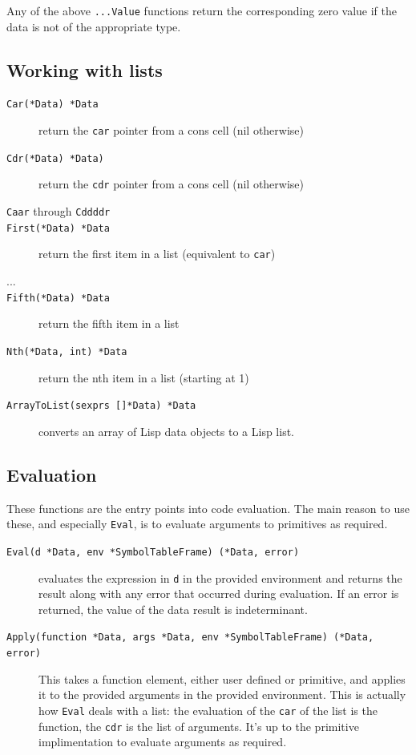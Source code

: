 \documentclass[12pt]{article}
\begin{document}
\noindent Any of the above \verb|...Value| functions return the
corresponding zero value if the data is 
not of the appropriate type.

\subsection{Working with lists}

\begin{description}
\item [{\tt Car(*Data) *Data}] return the \verb|car| pointer from a cons
  cell (nil otherwise)
\item [{\tt Cdr(*Data) *Data)}] return the \verb|cdr| pointer from a cons
  cell (nil otherwise)
\item [{\tt Caar} through {\tt Cddddr}]
\item [{\tt First(*Data) *Data}] return the first item in a list
  (equivalent to \verb|car|)
\item [...]
\item [{\tt Fifth(*Data) *Data}] return the fifth item in a list
\item [{\tt Nth(*Data, int) *Data}] return the nth item in a list
  (starting at 1)
\item [{\tt ArrayToList(sexprs []*Data) *Data}] converts an array of
  Lisp data objects to a Lisp list.
\end{description}

\subsection{Evaluation}

These functions are the entry points into code evaluation. The main
reason to use these, and especially \verb|Eval|, is to evaluate
arguments to primitives as required.

\begin{description}
\item [{\tt Eval(d *Data, env *SymbolTableFrame) (*Data, error)}] evaluates the expression in \verb|d| in the provided
  environment and returns the result along with any error that
  occurred during evaluation. If an error is returned, the value of
  the data result is indeterminant.
\item [{\tt Apply(function *Data, args *Data, env *SymbolTableFrame)
    (*Data, error)}] This takes a function element, either
  user defined or primitive, and applies it to the provided arguments
  in the provided environment. This is actually how \verb|Eval| deals
  with a list: the evaluation of the \verb|car| of the list is the
  function, the \verb|cdr| is the list of arguments. It's up to the
  primitive implimentation to evaluate arguments as required.
\end{description}
\end{document}
